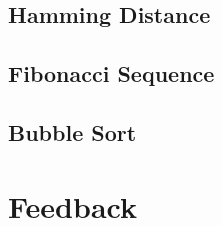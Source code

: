 \subsection{Hamming Distance}
\paragraph{}
\subsection{Fibonacci Sequence}
\paragraph{}
\subsection{Bubble Sort}
\paragraph{}
\section{Feedback}
\paragraph{}
